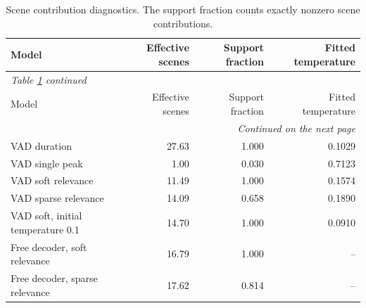 \begingroup
\small
\setlength{\tabcolsep}{4pt}
\begin{longtable}{p{7.3cm}rrr}
\caption{Scene contribution diagnostics. The support fraction counts exactly nonzero scene contributions.}\label{tab:support}\\
\toprule
Model & Effective scenes & Support fraction & Fitted temperature \\
\midrule\endfirsthead
\multicolumn{4}{l}{\textit{Table \ref{tab:support} continued}}\\
\toprule
Model & Effective scenes & Support fraction & Fitted temperature \\
\midrule\endhead
\midrule\multicolumn{4}{r}{\textit{Continued on the next page}}\\\endfoot
\bottomrule\endlastfoot
VAD duration & 27.63 & 1.000 & 0.1029 \\
VAD single peak & 1.00 & 0.030 & 0.7123 \\
VAD soft relevance & 11.49 & 1.000 & 0.1574 \\
VAD sparse relevance & 14.09 & 0.658 & 0.1890 \\
VAD soft, initial temperature 0.1 & 14.70 & 1.000 & 0.0910 \\
Free decoder, soft relevance & 16.79 & 1.000 & -- \\
Free decoder, sparse relevance & 17.62 & 0.814 & -- \\
\end{longtable}
\endgroup
